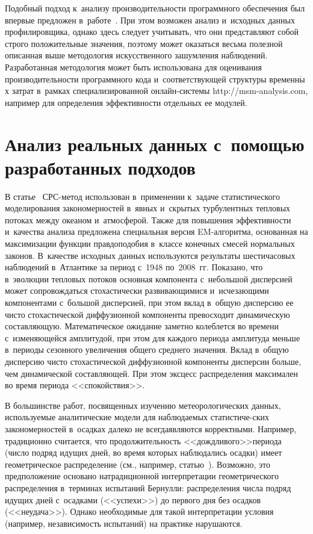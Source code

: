 \begin{multicols}{2}
Подобный подход к~анализу производитель\-ности программного обеспечения 
был впервые предложен в~работе~\cite{Gorshenin2016ICNAAM2}. При этом возможен 
анализ и~исходных данных профилировщика, однако здесь следует учитывать, что 
они представляют собой строго положительные значения, поэтому может оказаться 
весьма полезной описанная выше методология искусственного зашумления наблюдений. 
Разработанная методология может быть использована для оценивания производительности 
программного кода и~соответствующей структуры временн$\acute{\mbox{ы}}$х затрат в~рамках 
специализированной он\-лайн-сис\-те\-мы {\sf http://msm-analysis.com}, например 
для определения эффективности отдельных ее модулей.

\section{Анализ реальных данных с~помощью разработанных подходов}

В статье~\cite{Gorshenin2015Ocean} СРС-ме\-тод
использован в~применении к~задаче статистического моделирования закономерностей в~явных 
и~скрытых турбулентных теп\-ло\-вых потоках между океаном и~атмосферой. \mbox{Также} для 
повышения эффективности и~качества анализа предложена специальная версия EM-ал\-го\-рит\-ма, 
основанная на максимизации функции правдоподобия в~классе конечных смесей 
нормальных законов. В~качестве исходных данных используются результаты 
шестичасовых наблюдений в~Атлантике за период с~1948 по~2008~гг. 
Показано, что в~эволюции теп\-ло\-вых потоков основная компонента с~небольшой дисперсией 
может сопровождаться стохастически развивающимися и~исчезающими компонентами с~большой 
дис\-пер\-си\-ей, при этом вклад в~общую дисперсию ее чис\-то стохастической диффузионной 
компоненты превосходит динамическую со\-став\-ля\-ющую. Математическое ожидание заметно 
ко\-леб\-лет\-ся во времени с~изменяющейся амплитудой, при этом для каждого периода 
амплитуда меньше в~периоды сезонного увеличения общего среднего значения. Вклад в~общую 
дисперсию чис\-то стохастической диффузионной компоненты дис\-пер\-сии больше, чем 
динамической со\-став\-ля\-ющей. При этом эксцесс распределения максимален во время 
периода <<спокойствия>>.

В большинстве работ, посвященных изучению метеорологических данных, используемые 
аналитические модели для наблюдаемых статистиче-\linebreak ских
 закономерностей в~осадках 
далеко не всегда\linebreak являются корректными. Например, традиционно счи\-та\-ет\-ся, что 
продолжительность <<дождливого>>\linebreak перио\-да (чис\-ло подряд идущих дней, во время 
которых наблюдались осадки) имеет геометриче\-ское распределение (см., например, 
статью~\cite{Zolina2013}). Возмож\-но, это предположение основано на\linebreak традиционной 
интерпретации геометрического распределения в~терминах испытаний Бернулли: 
распределения числа подряд идущих дней с~осадками (<<успехи>>) до первого дня 
без осадков (<<неудача>>). Однако необходимые для такой интерпретации условия 
(например, независимость испытаний) на практике нарушаются.


\end{multicols}
